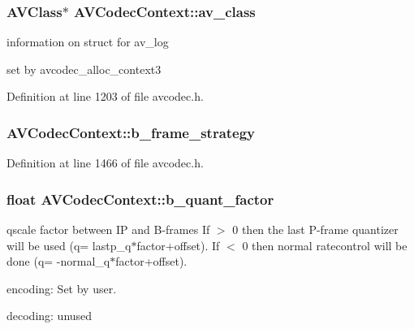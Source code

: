 \subsubsection[{\texorpdfstring{av\+\_\+class}{av_class}}]{ {\bf A\+V\+Class}$\ast$ A\+V\+Codec\+Context\+::av\+\_\+class}\hypertarget{struct_a_v_codec_context_a90622d3af2a9abba986a1c9f7ca21b16}{}\label{struct_a_v_codec_context_a90622d3af2a9abba986a1c9f7ca21b16}
information on struct for av\+\_\+log
\begin{DoxyItemize}
\item set by avcodec\+\_\+alloc\+\_\+context3 
\end{DoxyItemize}

Definition at line 1203 of file avcodec.\+h.

\subsubsection[{\texorpdfstring{b\+\_\+frame\+\_\+strategy}{b_frame_strategy}}]{ A\+V\+Codec\+Context\+::b\+\_\+frame\+\_\+strategy}\hypertarget{struct_a_v_codec_context_a64625af3f41e59bf3cf58be910a0cd3b}{}\label{struct_a_v_codec_context_a64625af3f41e59bf3cf58be910a0cd3b}


Definition at line 1466 of file avcodec.\+h.

\subsubsection[{\texorpdfstring{b\+\_\+quant\+\_\+factor}{b_quant_factor}}]{\setlength{\rightskip}{0pt plus 5cm}float A\+V\+Codec\+Context\+::b\+\_\+quant\+\_\+factor}\hypertarget{struct_a_v_codec_context_a40a7fdf60f853d9140bbe1204a66efb2}{}\label{struct_a_v_codec_context_a40a7fdf60f853d9140bbe1204a66efb2}
qscale factor between IP and B-\/frames If $>$ 0 then the last P-\/frame quantizer will be used (q= lastp\+\_\+q$\ast$factor+offset). If $<$ 0 then normal ratecontrol will be done (q= -\/normal\+\_\+q$\ast$factor+offset).
\begin{DoxyItemize}
\item encoding\+: Set by user.
\item decoding\+: unused 
\end{DoxyItemize}

